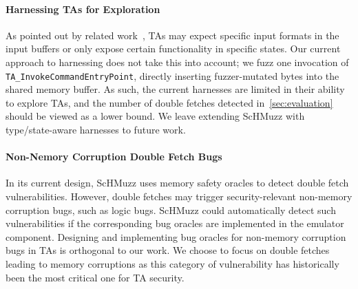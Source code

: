 \documentclass[conference]{IEEEtran}
\newcommand{\sysname}{ScHMuzz\xspace}
\newcommand{\stagetwo}{Double Fetch Snapshot Fuzzing\xspace}
\newcommand{\numvulns}{six\xspace}
\begin{document}
\paragraph{Harnessing TAs for Exploration}
As pointed out by related work~\cite{teezz,syncemu}, TAs may 
expect specific input formats in the input buffers or only expose certain functionality 
in specific states. Our current approach to harnessing does not take this into account; we fuzz 
one invocation of \texttt{TA\_InvokeCommandEntryPoint}, directly inserting fuzzer-mutated bytes 
into the shared memory buffer. As such, the current harnesses are limited in their ability to 
explore TAs, and the number of double fetches detected in~\autoref{sec:evaluation} should 
be viewed as a lower bound. We leave extending \sysname with type/state-aware harnesses to 
future work. 

\paragraph{Non-Nemory Corruption Double Fetch Bugs}
In its current design, \sysname uses memory safety oracles to detect double fetch vulnerabilities. 
However, double fetches may trigger security-relevant non-memory corruption 
bugs, such as logic bugs. \sysname could automatically detect such vulnerabilities if 
the corresponding bug oracles are implemented in the emulator component. Designing and implementing 
bug oracles for non-memory corruption bugs in TAs is orthogonal to our work. We choose to 
focus on double fetches leading to memory corruptions as this category of vulnerability has 
historically been the most critical one for TA security.

\end{document}
